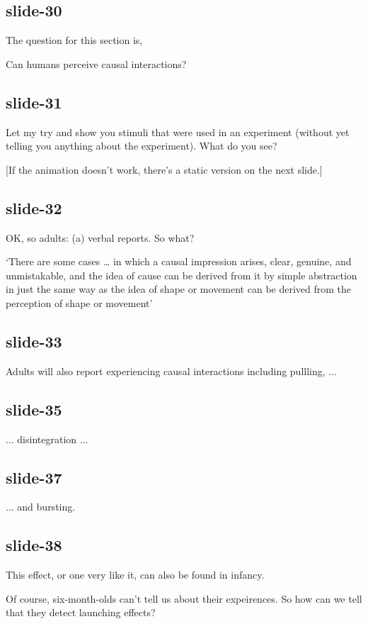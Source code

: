 \documentclass[12pt,\papersize]{extarticle}
\begin{document}
\subsection{slide-30}
The question for this section is,
 
Can humans perceive causal interactions?
 
\subsection{slide-31}
Let my try and show you stimuli that were used in an experiment (without yet telling you 
anything about the experiment).  What do you see?
 
[If the animation doesn't work, there's a static version on the next slide.]
 
\subsection{slide-32}
OK, so adults: (a) verbal reports.  So what?
 
‘There are some cases … in which a causal impression arises, clear, genuine, and unmistakable, 
and the idea of cause can be derived from it by simple abstraction in just the same way as the 
idea of shape or movement can be derived from the perception of shape or movement’ 
\citep[p.\ 270--1]{Michotte:1946nz}
 
\subsection{slide-33}
Adults will also report experiencing causal interactions including pullling, ...
 
\subsection{slide-35}
... disintegration ...
 
\subsection{slide-37}
... and bursting.
 
\subsection{slide-38}
This effect, or one very like
it, can also be found in infancy.
 
Of course, six-month-olds can't tell us about their expeirences.
So how can we tell that they detect launching effects?
 
\end{document}
